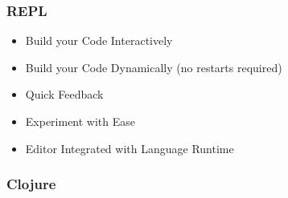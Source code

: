 \documentclass{beamer}
\begin{document}
\begin{frame}
  \frametitle{REPL}
  \begin{itemize}
  \item Build your Code Interactively
  \item Build your Code Dynamically (no restarts required)
  \item Quick Feedback
  \item Experiment with Ease
  \item Editor Integrated with Language Runtime
  \end{itemize}
  
\end{frame}

\begin{frame}
  \frametitle{Clojure}

\end{frame}

\end{document}
